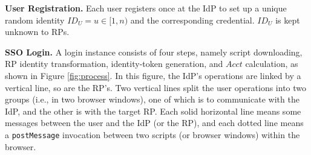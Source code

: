 
\noindent\textbf{User Registration.}
Each user registers once at the IdP to set up a unique random identity $ID_U = u \in [1, n)$ and the corresponding credential. $ID_U$ is kept unknown to RPs.


\vspace{0.5mm}
\noindent\textbf{SSO Login.} A login instance %
consists of four steps, namely script downloading, RP identity transformation,
identity-token generation, and $Acct$ calculation, as shown in Figure \ref{fig:process}.
In this figure,
    the IdP's operations are linked by a vertical line,
        so are the RP's.
Two vertical lines split the user operations into two groups (i.e., in two browser windows),
    one of which is to communicate with the IdP,
                 and the other is with the target RP.
Each solid horizontal line means some messages between the user and the IdP (or the RP),
            and each dotted line means a \verb+postMessage+ invocation between two scripts (or browser windows) within the browser.



